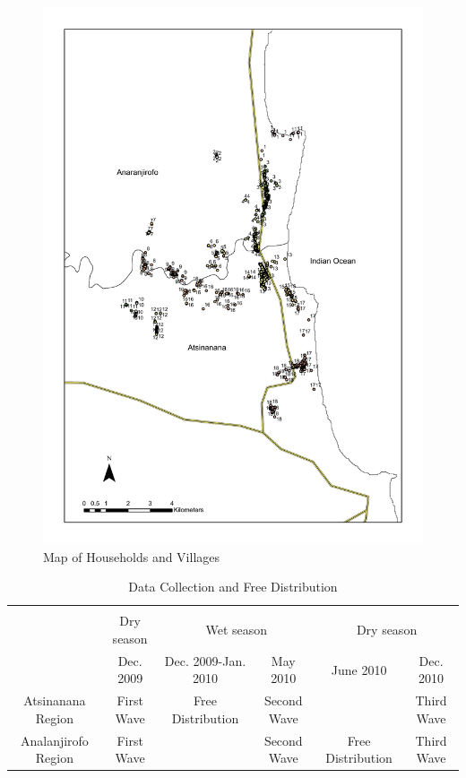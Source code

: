 \documentclass[fleqn,11pt]{article}
\begin{document}
\begin{figure}[h]
\centering
\includegraphics[scale=0.7]{madagascarmap.pdf}
\caption{Map of Households and Villages}
\label{map}
\end{figure}

\begin{table}[h]
\caption{Data Collection and Free Distribution}
\label{f:timing}\centering
\begin{tabular}{c c c c c c} 
 &&&\\
 &Dry season&\multicolumn{2}{c}{Wet season}&\multicolumn{2}{c}{Dry season}\\ \cmidrule(lr){2-2}\cmidrule(lr){3-4}\cmidrule(lr){5-6} 
 &Dec. 2009& Dec. 2009-Jan. 2010& May 2010 & June 2010 & Dec. 2010 \\ [0.5em]\hline 
 Atsinanana Region&  First Wave& Free Distribution &  Second Wave & & Third Wave\\ [0.5em]
 Analanjirofo Region& First Wave& &  Second Wave & Free Distribution &Third Wave \\
\end{tabular}
\end{table}
\end{document}
